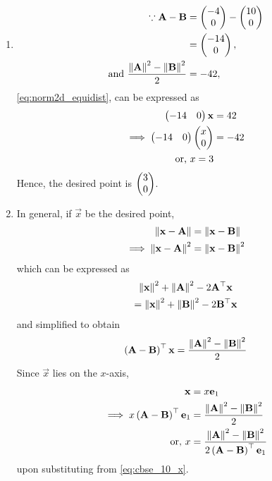 \documentclass[journal,12pt,twocolumn]{IEEEtran}
\renewcommand\thesection{\arabic{section}}
\begin{document}
\begin{enumerate}[label=\thesection.\arabic*.,ref=\thesection.\theenumi]
\begin{enumerate}
	\item 
		\begin{align}
	\because  \mathbf{A}-\mathbf{B} &= \begin{pmatrix} -4 \\ 0\end{pmatrix}-\begin{pmatrix}10 \\ 0\end{pmatrix}
	  \\
	  &= \begin{pmatrix} -14 \\ 0\end{pmatrix},
	  \\
			\text{and }	   \frac{\left\lVert\mathbf{A}\right\rVert^2 - \left\lVert\mathbf{B}\right\rVert^2}{2} &= -42,
  \end{align}
  \eqref{eq:norm2d_equidist}, can be expressed as 
  \begin{align}
	  \begin{pmatrix} -14 & 0\end{pmatrix}\mathbf{x} 
	  &=  42
	  \\
	  \implies 
	  \begin{pmatrix} -14 & 0\end{pmatrix}\begin{pmatrix}x \\ 0\end{pmatrix} 
	  &=  -42
	  \\
	  \text{or, } x =3 
  \end{align}
  Hence, the desired point is $\begin{pmatrix} 3 \\ 0\end{pmatrix}$.
\item In general, if $\vec{x}$ be the desired point, 
  \begin{align}
	  \left\lVert\mathbf{x}-\mathbf{A}\right\rVert
	  &=
	  \left\lVert\mathbf{x}-\mathbf{B}\right\rVert
	  \\
	  \implies \left\lVert\mathbf{x}-\mathbf{A}\right\rVert^2
	  &=
	  \left\lVert\mathbf{x}-\mathbf{B}\right\rVert^2
  \end{align}
  which can be expressed as 
  \begin{multline}
	  \left\lVert\mathbf{x}\right\rVert^2+\left\lVert\mathbf{A}\right\rVert^2 - 2 \mathbf{A}^{\top }\mathbf{x}
	  \\
	  =
	  \left\lVert\mathbf{x}\right\rVert^2+\left\lVert\mathbf{B}\right\rVert^2 - 2 \mathbf{B}^{\top }\mathbf{x}
  \end{multline}
  and simplified to obtain 
  \begin{align}
	  \label{eq:cbse_10_x}
	   \left(\mathbf{A}-\mathbf{B}\right)^{\top }\mathbf{x}
	  =
	  \frac{\left\lVert\mathbf{A}\right\rVert^2 -\left\lVert\mathbf{B}\right\rVert^2 }{2}
  \end{align}
  Since $\vec{x}$ lies on the $x$-axis, 
  \begin{align}
	  \mathbf{x} &=
	   x\mathbf{e}_1
	  \\
	  \implies 
	   x\left(\mathbf{A}-\mathbf{B}\right)^{\top }\mathbf{e}_1
		  &=
	  \frac{\left\lVert\mathbf{A}\right\rVert^2 -\left\lVert\mathbf{B}\right\rVert^2 }{2}
	  \\
	  \text{or, } x &=\frac{\left\lVert\mathbf{A}\right\rVert^2 -\left\lVert\mathbf{B}\right\rVert^2 }{2\left(\mathbf{A}-\mathbf{B}\right)^{\top }\mathbf{e}_1
}
  \end{align}
	  upon substituting from \eqref{eq:cbse_10_x}.



\end{enumerate}
\end{enumerate}
\end{document}
